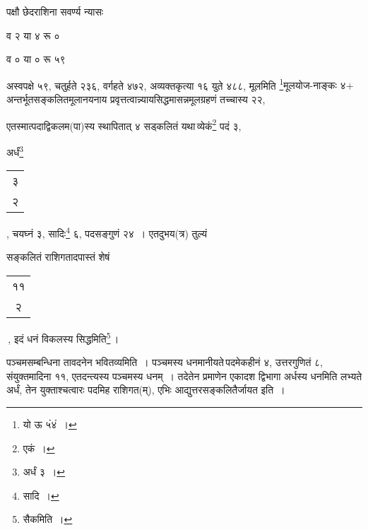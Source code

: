 \documentclass[10pt, openany]{book}
\begin{document}
{{{{{{{{{{{{पक्षौ छेदराशिना सवर्ण्य न्यासः\textendash}
\vspace{2mm}

\hspace{20mm} व २ या ४ रू ० 

\hspace{20mm} व ० या ० रू ५९
\vspace{3mm}

{अस्वपक्षे ५९, चतुर्हते २३६, वर्गहते ४७२, अव्यक्तकृत्या १६ युते ४८८,
मूलमिति}
{\renewcommand{\thefootnote}{१७}\footnote{यो ऊ ५ं४ं~।}मूलयोज-नाङ्कः ४$+$ अन्तर्भूतसङ्कलितमूलानयनाय
प्रवृत्तत्वान्न्यायसिद्धमासन्नमूलग्रहणं तच्चास्य २२,}

\newpage

\vspace{3mm}

{एतस्मात्पदाद्विकलम(पा)स्य स्थापितात् ४ सड्कलितं यथा\textendash \,व्येकं\renewcommand{\thefootnote}{१}\footnote{एकं~।} पदं ३,}
{अर्धं\renewcommand{\thefootnote}{२}\footnote{अर्धं ३~।}\begin{tabular}{c}३\\२ \end{tabular}, चयघ्नं ३, सादिः\renewcommand{\thefootnote}{३}\footnote{सादि~।} ६, पदसङ्गुणं २४~। एतदुभय(त्र) तुल्यं}
{सङ्कलितं राशिगतादपास्तं शेषं \begin{tabular}{c|}११\\२\\\hline \end{tabular}\,, इदं धनं विकलस्य सिद्धमिति\renewcommand{\thefootnote}{४}\footnote{सैकमिति~।}\,।}
{पञ्चमसम्बन्धिना तावदनेन भवितव्यमिति~। पञ्चमस्य धनमानीयते\textendash \,पदमेकहीनं ४,}
{उत्तरगुणितं ८, संयुक्तमादिना ११, एतदन्त्यस्य पञ्चमस्य धनम्~। तदेतेन}
{प्रमाणेन एकादश द्विभागा अर्धस्य धनमिति लभ्यते अर्धं, तेन युक्ताश्चत्वारः}
{पदमिह राशिगत(म्), एभिः आद्युत्तरसङ्कलितैर्जायत इति~।}
\vspace{3mm}

}}}}}}}}}}}
\end{document}
